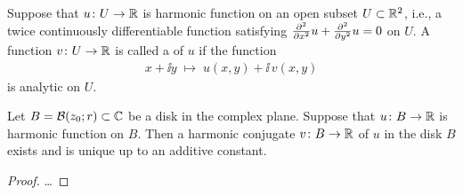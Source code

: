 \begin{definition}
  \label{def:harmonic_conjugate}
  Suppose that $u \colon U \to \bR$ is harmonic function
  on an open subset $U \subset \bR^2$, i.e., a twice continuously
  differentiable function satisfying $\pdder{x} u + \pdder{y} u = 0$
  on $U$. A function $v \colon U \to \bR$ is called a
   of $u$ if the function
  \begin{align*}
    x + \ii y \; \mapsto \; u(x,y) + \ii \, v(x,y)
  \end{align*}
  is analytic on $U$.
\end{definition}

\begin{lemma}
  \label{lem:existence_of_harmonic_conjugate}
  Let $B = \BallRC{r}{z_0} \subset \bC$ be a disk in the complex plane.
  Suppose that $u \colon B \to \bR$ is harmonic function on $B$. Then a
  harmonic conjugate $v \colon B \to \bR$ of $u$ in the disk $B$ exists and
  is unique up to an additive constant.
\end{lemma}
\begin{proof}
  \ldots
\end{proof}
